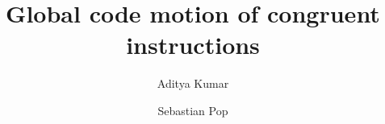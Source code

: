 \documentclass[sigplan,10pt,review,anonymous]{acmart}\settopmatter{printfolios=true,printccs=false,printacmref=false}
\begin{document}
\title[SSA GCM]{Global code motion of congruent instructions}         %

\def \GCC {GCC}
\def \LLVM {LLVM}
\def \CFG {CFG}
\def \SSA {SSA}
\def \MemorySSA {MemorySSA}
\def \PRE {PRE}
\def \GVN {GVN}
\def \SPEC {SPEC Cpu 2006}
\def \gcm {global-code-motion}
\def \GCM {GCM}
\def \xlinux {x86\_64-linux}
\def \ooo {out-of-order}


\author{Aditya Kumar}

\author{Sebastian Pop}
\end{document}
